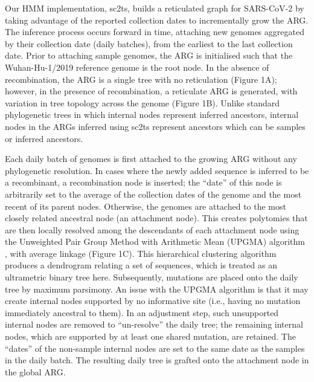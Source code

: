 \documentclass{article}
\begin{document}
Our HMM implementation, sc2ts, builds a reticulated graph for SARS-CoV-2 by taking advantage of the reported collection dates to incrementally grow the ARG. The inference process occurs forward in time, attaching new genomes aggregated by their collection date (daily batches), from the earliest to the last collection date. Prior to attaching sample genomes, the ARG is initialised such that the Wuhan-Hu-1/2019 reference genome is the root node. In the absence of recombination, the ARG is a single tree with no reticulation (Figure 1A); however, in the presence of recombination, a reticulate ARG is generated, with variation in tree topology across the genome (Figure 1B). Unlike standard phylogenetic trees in which internal nodes represent inferred ancestors, internal nodes in the ARGs inferred using sc2ts represent ancestors which can be samples or inferred ancestors.

Each daily batch of genomes is first attached to the growing ARG without any phylogenetic resolution. In cases where the newly added sequence is inferred to be a recombinant, a recombination node is inserted; the “date” of this node is arbitrarily set to the average of the collection dates of the genome and the most recent of its parent nodes. Otherwise, the genomes are attached to the most closely related ancestral node (an attachment node). This creates polytomies that are then locally resolved among the descendants of each attachment node using the Unweighted Pair Group Method with Arithmetic Mean (UPGMA) algorithm \cite{Michener1957-tr}, with average linkage (Figure 1C). This hierarchical clustering algorithm produces a dendrogram relating a set of sequences, which is treated as an ultrametric binary tree here. Subsequently, mutations are placed onto the daily tree by maximum parsimony. An issue with the UPGMA algorithm is that it may create internal nodes supported by no informative site (i.e., having no mutation immediately ancestral to them). In an adjustment step, such unsupported internal nodes are removed to “un-resolve” the daily tree; the remaining internal nodes, which are supported by at least one shared mutation, are retained. The “dates” of the non-sample internal nodes are set to the same date as the samples in the daily batch. The resulting daily tree is grafted onto the attachment node in the global ARG.
\end{document}
